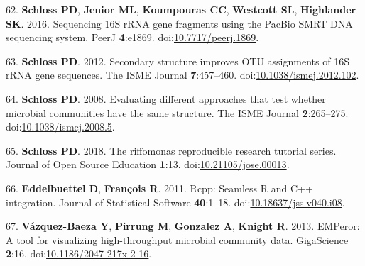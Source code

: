 \documentclass[11pt,]{article}
\begin{document}
\leavevmode\hypertarget{ref-Schloss2016b}{}%
62. \textbf{Schloss PD}, \textbf{Jenior ML}, \textbf{Koumpouras CC},
\textbf{Westcott SL}, \textbf{Highlander SK}. 2016. Sequencing 16S rRNA
gene fragments using the PacBio SMRT DNA sequencing system. PeerJ
\textbf{4}:e1869.
doi:\href{https://doi.org/10.7717/peerj.1869}{10.7717/peerj.1869}.

\leavevmode\hypertarget{ref-Schloss2012a}{}%
63. \textbf{Schloss PD}. 2012. Secondary structure improves OTU
assignments of 16S rRNA gene sequences. The ISME Journal
\textbf{7}:457--460.
doi:\href{https://doi.org/10.1038/ismej.2012.102}{10.1038/ismej.2012.102}.

\leavevmode\hypertarget{ref-Schloss2008}{}%
64. \textbf{Schloss PD}. 2008. Evaluating different approaches that test
whether microbial communities have the same structure. The ISME Journal
\textbf{2}:265--275.
doi:\href{https://doi.org/10.1038/ismej.2008.5}{10.1038/ismej.2008.5}.

\leavevmode\hypertarget{ref-Schloss2018a}{}%
65. \textbf{Schloss PD}. 2018. The riffomonas reproducible research
tutorial series. Journal of Open Source Education \textbf{1}:13.
doi:\href{https://doi.org/10.21105/jose.00013}{10.21105/jose.00013}.

\leavevmode\hypertarget{ref-Eddelbuettel2011}{}%
66. \textbf{Eddelbuettel D}, \textbf{François R}. 2011. Rcpp: Seamless R
and C++ integration. Journal of Statistical Software \textbf{40}:1--18.
doi:\href{https://doi.org/10.18637/jss.v040.i08}{10.18637/jss.v040.i08}.

\leavevmode\hypertarget{ref-VzquezBaeza2013}{}%
67. \textbf{Vázquez-Baeza Y}, \textbf{Pirrung M}, \textbf{Gonzalez A},
\textbf{Knight R}. 2013. EMPeror: A tool for visualizing high-throughput
microbial community data. GigaScience \textbf{2}:16.
doi:\href{https://doi.org/10.1186/2047-217x-2-16}{10.1186/2047-217x-2-16}.
\end{document}
